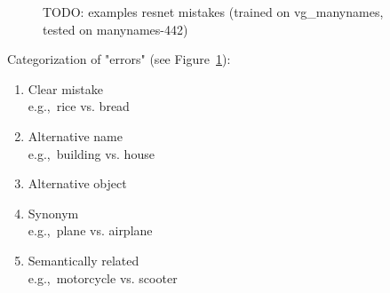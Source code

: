 \begin{figure}
	\caption{TODO: examples resnet mistakes (trained on vg\_manynames, tested on manynames-442)\label{fig:mistakes} }
\end{figure}

Categorization of "errors" (see Figure~\ref{fig:mistakes}):
\begin{enumerate}
	\item Clear mistake \\
	e.g.,\ rice vs. bread
	\item Alternative name\\
	e.g.,\ building vs. house
	\item Alternative object 
	\item Synonym\\
	e.g.,\ plane vs. airplane
	\item Semantically related\\
	e.g.,\  motorcycle vs. scooter
\end{enumerate}

